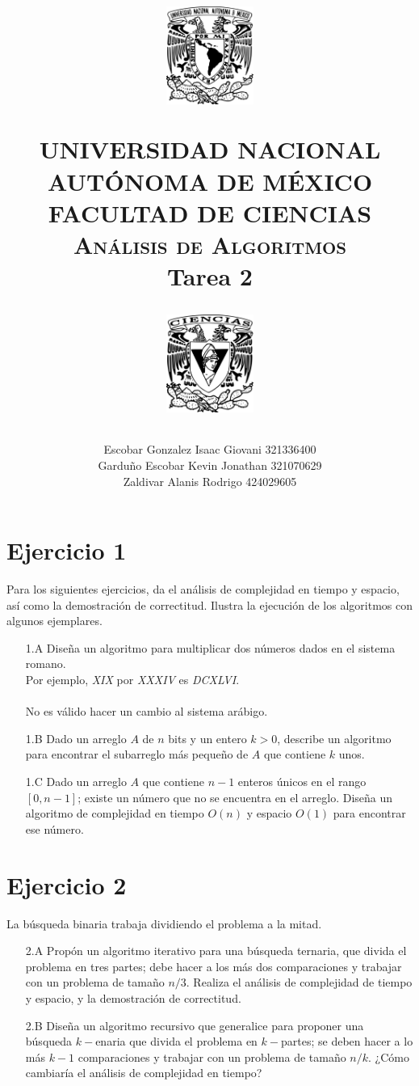 \documentclass[12pt]{article}
\title{
		\vspace{-0.7in} 	
		\usefont{OT1}{bch}{b}{n}
		\begin{minipage}{3cm}
        \vspace{-0.5in} 	
    	\begin{center}
    		\includegraphics[height=3.2cm]{../logo_unam.png}
    	\end{center}
    \end{minipage}\hfill
    \begin{minipage}{10.7cm}
    
    	\begin{center}
\normalfont \normalsize \textsc{UNIVERSIDAD NACIONAL AUTÓNOMA DE MÉXICO \\ FACULTAD DE CIENCIAS \\ Análisis de Algoritmos } \\
		\huge Tarea 2
    	\end{center}
     
    \end{minipage}\hfill
    \begin{minipage}{3.2cm}
    \vspace{-0.5in} 
    	\begin{center}
    		\includegraphics[height=3.2cm]{../logo_fc.png}
    	\end{center}
    \end{minipage}

\author{Escobar Gonzalez Isaac Giovani \hspace{1cm} 321336400\\
        Garduño Escobar Kevin Jonathan \hspace{0.5cm} 321070629\\
        Zaldivar Alanis Rodrigo \hspace{2.75cm} 424029605 }
\date{}
}
\begin{document}
\maketitle

\section*{Ejercicio 1}
Para los siguientes ejercicios, da el análisis de complejidad en tiempo y espacio, así como la demostración de correctitud. Ilustra la ejecución de los algoritmos con algunos ejemplares.
\begin{itemize}
    \item[1.A] Diseña un algoritmo para multiplicar dos números dados en el sistema romano.\\
    Por ejemplo, \textit{XIX} por \textit{XXXIV} es \textit{DCXLVI}.\\\\
    No es válido hacer un cambio al sistema arábigo.
    \item[1.B] Dado un arreglo $A$ de $n$ bits y un entero $k > 0$, describe un algoritmo para encontrar el subarreglo más pequeño de $A$ que contiene $k$ unos.
    \item[1.C] Dado un arreglo $A$ que contiene $n - 1$ enteros  únicos en el rango $[0, n - 1]$; existe un número que no se encuentra en el arreglo. Diseña un algoritmo de complejidad en tiempo $O(n)$ y espacio $O(1)$ para encontrar ese número.
\end{itemize}

\section*{Ejercicio 2}
La búsqueda binaria trabaja dividiendo el problema a la mitad.
\begin{itemize}
    \item[2.A] Propón un algoritmo iterativo para una búsqueda ternaria, que divida el problema en tres partes; debe hacer a los más dos comparaciones y trabajar con un problema de tamaño $n/3$. Realiza el análisis de complejidad de tiempo y espacio, y la demostración de correctitud.
    \item[2.B] Diseña un algoritmo recursivo que generalice para proponer una búsqueda $k-$enaria que divida el problema en $k-$partes; se deben hacer a lo más $k - 1$ comparaciones y trabajar con un problema de tamaño $n/k$. ¿Cómo cambiaría el análisis de complejidad en tiempo?
\end{itemize}
\end{document}
